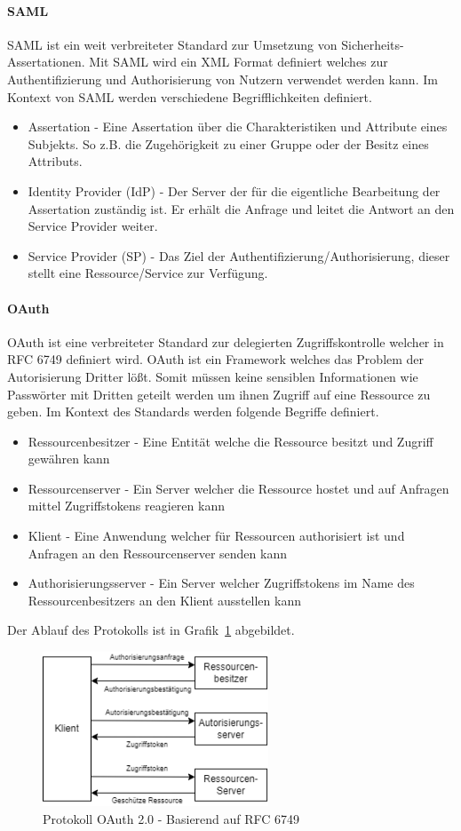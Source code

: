 \documentclass[11pt]{article}
\begin{document}
\paragraph{SAML}
SAML ist ein weit verbreiteter Standard zur Umsetzung von Sicherheits-Assertationen. Mit SAML wird ein XML Format definiert welches zur Authentifizierung und Authorisierung von Nutzern verwendet werden kann. Im Kontext von SAML werden verschiedene Begrifflichkeiten definiert.~\cite{hughes2005security}
\begin{itemize}
  \item Assertation - Eine Assertation über die Charakteristiken und Attribute eines Subjekts. So z.B. die Zugehörigkeit zu einer Gruppe oder der Besitz eines Attributs.
  \item Identity Provider (IdP) - Der Server der für die eigentliche Bearbeitung der Assertation zuständig ist. Er erhält die Anfrage und leitet die Antwort an den Service Provider weiter.
  \item Service Provider (SP) - Das Ziel der Authentifizierung/Authorisierung, dieser stellt eine Ressource/Service zur Verfügung.
\end{itemize}
\paragraph{OAuth}
OAuth ist eine verbreiteter Standard zur delegierten Zugriffskontrolle welcher in RFC 6749 definiert wird. OAuth ist ein Framework welches das Problem der Autorisierung Dritter lößt. Somit müssen keine sensiblen Informationen wie Passwörter mit Dritten geteilt werden um ihnen Zugriff auf eine Ressource zu geben. Im Kontext des Standards werden folgende Begriffe definiert.
\begin{itemize}
  \item Ressourcenbesitzer - Eine Entität welche die Ressource besitzt und Zugriff gewähren kann
  \item Ressourcenserver - Ein Server welcher die Ressource hostet und auf Anfragen mittel Zugriffstokens reagieren kann
  \item Klient - Eine Anwendung welcher für Ressourcen authorisiert ist und Anfragen an den Ressourcenserver senden kann
  \item Authorisierungsserver - Ein Server welcher Zugriffstokens im Name des Ressourcenbesitzers an den Klient ausstellen kann
\end{itemize}
Der Ablauf des Protokolls ist in Grafik~\cref{fig:oauth} abgebildet.~\cite{rfc6749}
\begin{figure}[H]
  \centering
  \includegraphics[width=0.6\textwidth]{assets/oauth.png}
  \caption{Protokoll OAuth 2.0 - Basierend auf RFC 6749}\label{fig:oauth}
\end{figure}
\end{document}
